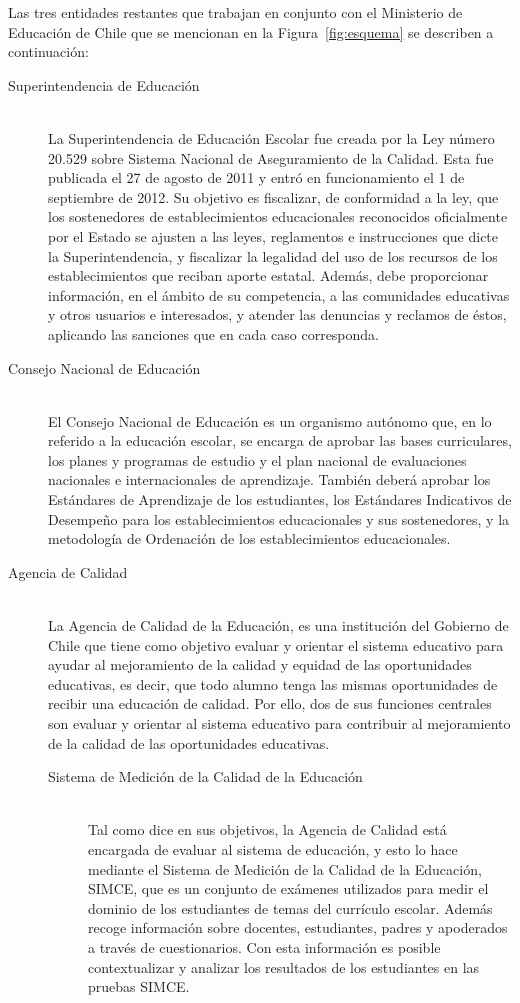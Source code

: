 Las tres entidades restantes que trabajan en conjunto con el Ministerio de Educación de Chile que se mencionan en la Figura~\ref{fig:esquema} se describen a continuación: 

\begin{description}
\item[Superintendencia de Educación] \hfill \\
La Superintendencia de Educación Escolar fue creada por la Ley número 20.529 sobre Sistema Nacional de Aseguramiento de la Calidad. Esta fue publicada el 27 de agosto de 2011 y entró en funcionamiento el 1 de septiembre de 2012. 
Su objetivo es fiscalizar, de conformidad a la ley, que los sostenedores de establecimientos educacionales reconocidos oficialmente por el Estado se ajusten a las leyes, reglamentos e instrucciones que dicte la Superintendencia, y fiscalizar la legalidad del uso de los recursos de los establecimientos que reciban aporte estatal. Además, debe proporcionar información, en el ámbito de su competencia, a las comunidades educativas y otros usuarios e interesados, y atender las denuncias y reclamos de éstos, aplicando las sanciones que en cada caso corresponda. \cite{superint}
\item[Consejo Nacional de Educación] \hfill \\
El Consejo Nacional de Educación es un organismo autónomo que, en lo referido a la educación escolar, se encarga de aprobar las bases curriculares, los planes y programas de estudio y el plan nacional de evaluaciones nacionales e internacionales de aprendizaje. También deberá aprobar los Estándares de Aprendizaje de los estudiantes, los Estándares Indicativos de Desempeño para los establecimientos educacionales y sus sostenedores, y la metodología de Ordenación de los establecimientos educacionales.

\newpage

\item[Agencia de Calidad] \hfill \\
La Agencia de Calidad de la Educación, es una institución del Gobierno de Chile que tiene como objetivo  evaluar y orientar el sistema educativo para ayudar al mejoramiento de la calidad y equidad de las oportunidades educativas, es decir, que todo alumno tenga las mismas oportunidades de recibir una educación de calidad. Por ello, dos de sus funciones centrales son evaluar y orientar al sistema educativo para contribuir al mejoramiento de la calidad de las oportunidades educativas. \cite{agenciacalidad}
    \begin{description}
    \item [Sistema de Medición de la Calidad de la Educación] \hfill \\
    Tal como dice en sus objetivos, la Agencia de Calidad está encargada de evaluar al sistema de educación, y esto lo hace mediante el Sistema de Medición de la Calidad de la Educación, SIMCE, que es un conjunto de exámenes utilizados para medir el dominio de los estudiantes de temas del currículo escolar. Además recoge información sobre docentes, estudiantes, padres y apoderados a través de cuestionarios. Con esta información es posible contextualizar y analizar los resultados de los estudiantes en las pruebas SIMCE. 
    

\end{description}
\end{description}
